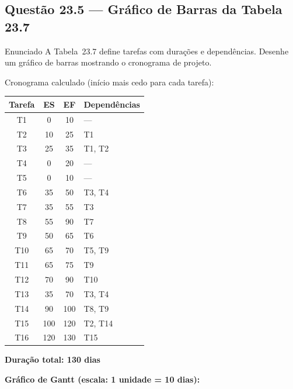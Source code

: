 \documentclass[12pt,a4paper]{article}
\begin{document}
\subsection*{Questão 23.5 — Gráfico de Barras da Tabela 23.7}
\begin{questao}{Enunciado}
A Tabela~23.7 define tarefas com durações e dependências. Desenhe um gráfico
de barras mostrando o cronograma de projeto.
\end{questao}
\begin{resposta}
Cronograma calculado (início mais cedo para cada tarefa):

\begin{center}\small
\begin{tabular}{cccp{5cm}}
\toprule
\textbf{Tarefa} & \textbf{ES} & \textbf{EF} & \textbf{Dependências} \\
\midrule
T1 & 0 & 10 & --- \\
T2 & 10 & 25 & T1 \\
T3 & 25 & 35 & T1, T2 \\
T4 & 0 & 20 & --- \\
T5 & 0 & 10 & --- \\
T6 & 35 & 50 & T3, T4 \\
T7 & 35 & 55 & T3 \\
T8 & 55 & 90 & T7 \\
T9 & 50 & 65 & T6 \\
T10 & 65 & 70 & T5, T9 \\
T11 & 65 & 75 & T9 \\
T12 & 70 & 90 & T10 \\
T13 & 35 & 70 & T3, T4 \\
T14 & 90 & 100 & T8, T9 \\
T15 & 100 & 120 & T2, T14 \\
T16 & 120 & 130 & T15 \\
\bottomrule
\end{tabular}
\quad \textbf{Duração total: 130 dias}
\end{center}

\textbf{Gráfico de Gantt (escala: 1 unidade = 10 dias):}

\begin{center}
\end{center}
\end{resposta}
\end{document}
